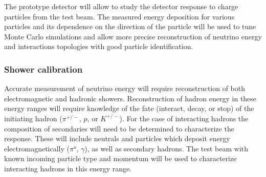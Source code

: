 The prototype detector will allow to study the detector response to charge particles from the test beam. The measured energy deposition for various particles and its dependence on the direction of the particle will be used to tune
Monte Carlo simulations and allow more precise reconstruction of neutrino energy and interactions topologies with good particle identification.


\subsubsection{Shower calibration}
\label{sec:showers}

Accurate measurement of neutrino energy will require reconstruction of both electromagnetic and hadronic showers. Reconstruction of hadron energy 
in these energy ranges will require knowledge of the fate (interact, decay, or stop) of the
initiating hadron ($\pi^{+/-}$, $p$, or $K^{+/-}$).
For the case of  interacting hadrons the composition of secondaries
will need to be determined to characterize the response. 
These will include neutrals and particles which 
deposit energy electromagnetically ($\pi^o$, $\gamma$), as well as
secondary hadrons.
The test beam with known incoming particle type and momentum will be used
to characterize interacting hadrons in this energy range.

